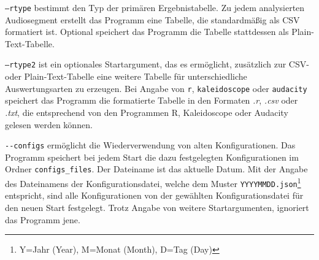 \texttt{--rtype} bestimmt den Typ der primären Ergebnistabelle. Zu jedem analysierten Audiosegment erstellt das Programm eine Tabelle, die standardmäßig als CSV formatiert ist. Optional speichert das Programm die Tabelle stattdessen als Plain-Text-Tabelle.




\texttt{--rtype2} ist ein optionales Startargument, das es ermöglicht, zusätzlich zur CSV- oder Plain-Text-Tabelle eine weitere Tabelle für unterschiedliche Auswertungsarten zu erzeugen. Bei Angabe von \texttt{r}, \texttt{kaleidoscope} oder \texttt{audacity} speichert das Programm die formatierte Tabelle in den Formaten \textit{.r}, \textit{.csv} oder \textit{.txt}, die entsprechend von den Programmen R, Kaleidoscope oder Audacity gelesen werden können.

\texttt{-{}-configs} ermöglicht die Wiederverwendung von alten Konfigurationen.
Das Programm speichert bei jedem Start die dazu festgelegten Konfigurationen im Ordner \texttt{configs\_files}. Der Dateiname ist das aktuelle Datum. Mit der Angabe des Dateinamens der Konfigurationsdatei, welche dem Muster \texttt{YYYYMMDD.json}\footnote{Y=Jahr (Year), M=Monat (Month), D=Tag (Day)} entspricht, sind alle Konfigurationen von der gewählten Konfigurationsdatei für den neuen Start festgelegt. Trotz Angabe von weitere Startargumenten, ignoriert das Programm jene.


